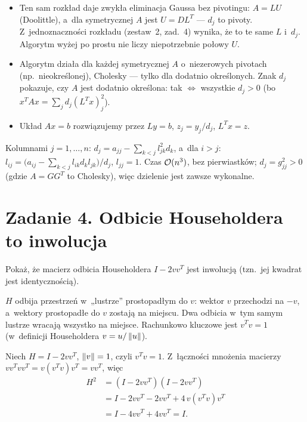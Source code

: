 \documentclass[11pt]{article}
\begin{document}
\begin{uwaga}
\begin{itemize}
\item Ten sam rozkład daje zwykła eliminacja Gaussa bez pivotingu: $A=LU$
(Doolittle), a~dla symetrycznej $A$ jest $U=DL^T$ --- $d_j$ to pivoty.
Z~jednoznaczności rozkładu (zestaw~2, zad.~4) wynika, że to te same $L$
i~$d_j$. Algorytm wyżej po prostu nie liczy niepotrzebnie połowy $U$.
\item Algorytm działa dla każdej symetrycznej $A$ o~niezerowych pivotach
(np.\ nieokreślonej), Cholesky --- tylko dla dodatnio określonych.
Znak $d_j$ pokazuje, czy $A$ jest dodatnio określona: tak $\iff$ wszystkie
$d_j>0$ (bo $x^TAx=\sum_jd_j(L^Tx)_j^2$).
\item Układ $Ax=b$ rozwiązujemy przez $Ly=b$, $z_j=y_j/d_j$, $L^Tx=z$.
\end{itemize}
\end{uwaga}

\begin{odpowiedz}
Kolumnami $j=1,\ldots,n$:
$d_j=a_{jj}-\sum_{k<j}l_{jk}^2d_k$, a~dla $i>j$:
$l_{ij}=\bigl(a_{ij}-\sum_{k<j}l_{ik}d_kl_{jk}\bigr)/d_j$, $l_{jj}=1$.
Czas $\mathcal{O}(n^3)$, bez pierwiastków; $d_j=g_{jj}^2>0$ (gdzie $A=GG^T$ to
Cholesky), więc dzielenie jest zawsze wykonalne.
\end{odpowiedz}

\section{Zadanie 4. Odbicie Householdera to inwolucja}
\begin{tresc}
Pokaż, że macierz odbicia Householdera $I-2vv^T$ jest inwolucją (tzn.\
jej kwadrat jest identycznością).
\end{tresc}

\begin{intuicja}
$H$ odbija przestrzeń w~„lustrze” prostopadłym do $v$: wektor $v$
przechodzi na $-v$, a~wektory prostopadłe do $v$ zostają na miejscu.
Dwa odbicia w~tym samym lustrze wracają wszystko na miejsce. Rachunkowo
kluczowe jest $v^Tv=1$ (w~definicji Householdera $v=u/\left\lVert u \right\rVert$).
\end{intuicja}

\formalnie
Niech $H=I-2vv^T$, $\left\lVert v \right\rVert=1$, czyli $v^Tv=1$. Z~łączności mnożenia
macierzy $vv^Tvv^T=v(v^Tv)v^T=vv^T$, więc
\begin{align*}
H^2&=(I-2vv^T)(I-2vv^T)\\
&=I-2vv^T-2vv^T+4\,v(v^Tv)v^T\\
&=I-4vv^T+4vv^T=I.
\end{align*}
\end{document}
